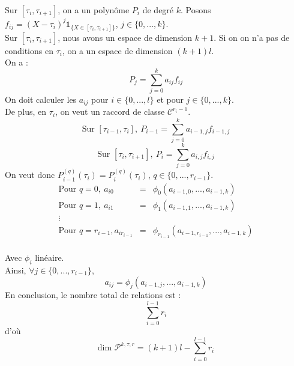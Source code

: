 
\begin{dem}
Sur $[\tau_i,\tau_{i+1}]$, on a un polynôme $P_i$ de degré $k$. Posons $f_{ij}=(X-\tau_i)^j\mathds{1}_{\{X\in[\tau_i, \tau_{i+1}]\}}$, $j\in\{0,...,k\}$.\\
Sur $[\tau_i, \tau_{i+1}]$, nous avons un espace de dimension $k+1$. Si on on n'a pas de conditions en $\tau_i$, on a un espace de dimension $(k+1)l$.\\
On a :
\[P_j=\sum_{j=0}^k a_{ij} f_{ij}\]
On doit calculer les $a_{ij}$ pour $i\in \{0,...,l\}$ et pour $j\in \{0,...,k\}$.\\
De plus, en $\tau_i$, on veut un raccord de classe $\mathcal{C}^{r_i-1}$.\\
\[\text{Sur } [\tau_{i-1}, \tau_i],\ P_{i-1}=\sum_{j=0}^k a_{i-1,j} f_{i-1,j}\]
\[\text{Sur } [\tau_i, \tau_{i+1}],\ P_i=\sum_{j=0}^k a_{i,j} f_{i,j}\]
On veut donc $P_{i-1}^{(q)}(\tau_i)=P_i^{(q)}(\tau_i)$, $q\in\{0,...,r_{i-1}\}$.
\begin{eqnarray*}
\text{Pour } q=0,\ a_{i0}&=&\phi_0(a_{i-1,0},...,a_{i-1,k})\\
\text{Pour } q=1,\ a_{i1}&=&\phi_1(a_{i-1,1},...,a_{i-1,k})\\
\vdots\\
\text{Pour } q=r_{i-1}, a_{ir_{i-1}}&=&\phi_{r_{i-1}}(a_{i-1,r_{i-1}},...,a_{i-1,k})\\
\end{eqnarray*}

Avec $\phi_i$ linéaire.\\
Ainsi, $\forall j\in\{0,...,r_{i-1}\}$, \[a_{ij}=\phi_{j}(a_{i-1,j},...,a_{i-1,k})\]
En conclusion, le nombre total de relations est : \[\sum_{i=0}^{l-1} r_i\]
d'où \[\text{dim } \mathcal{P}^{k,\tau,r}=(k+1)l-\sum_{i=0}^{l-1} r_i\]


\end{dem}
